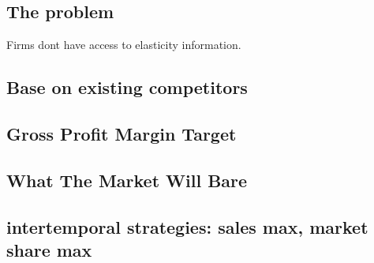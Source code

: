 

\subsection{The problem}
Firms dont have access to elasticity information.

\subsection{Base on existing competitors}

\subsection{Gross Profit Margin Target}

\subsection{What The Market Will Bare}

\subsection{intertemporal strategies: sales max, market share max}

